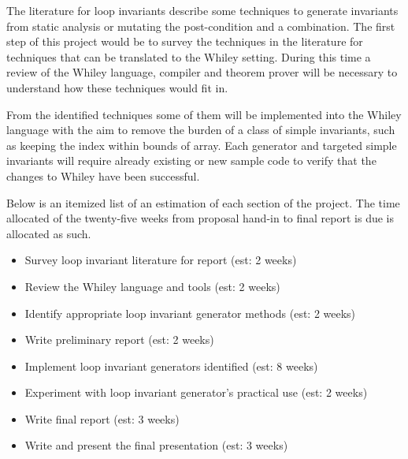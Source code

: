 \documentclass[11pt, a4paper, twoside, openright]{report}
\begin{document}
%

The literature for loop invariants describe some techniques to generate
invariants from static analysis or mutating the post-condition and a 
combination. The first step of this project would be to survey the techniques
in the literature for techniques that can be translated to the Whiley setting.
During this time a review of the Whiley language, compiler and theorem prover
will be necessary to understand how these techniques would fit in.

From the identified techniques some of them will be implemented into the
Whiley language with the aim to remove the burden of a class of simple invariants,
such as keeping the index within bounds of array.
Each generator and targeted simple invariants will require already existing
or new sample code to verify that the changes to Whiley have been successful.

Below is an itemized list of an estimation of each section of the project.
The time allocated of the twenty-five weeks from proposal hand-in to
final report is due is allocated as such. 

\begin{itemize}
    \item Survey loop invariant literature for report (est: 2 weeks) 
    \item Review the Whiley language and tools (est: 2 weeks)
    \item Identify appropriate loop invariant generator methods (est: 2 weeks)
    \item Write preliminary report (est: 2 weeks)
    \item Implement loop invariant generators identified (est: 8 weeks)
    \item Experiment with loop invariant generator's practical use (est: 2 weeks)
    \item Write final report (est: 3 weeks)
    \item Write and present the final presentation (est: 3 weeks)
\end{itemize}
\end{document}
